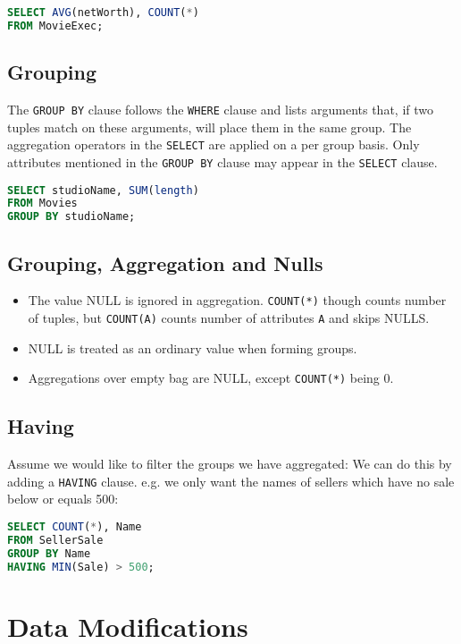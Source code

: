 \documentclass{article}
\renewcommand{\t}[1]{\texttt{#1}}
\begin{document}
\begin{lstlisting}[language=SQL]
SELECT AVG(netWorth), COUNT(*) 
FROM MovieExec;
\end{lstlisting}


\subsection*{Grouping}
The \t{GROUP BY} clause follows the \t{WHERE} clause and lists arguments that, if two tuples match on these arguments, will place them in the same group. The aggregation operators in the \t{SELECT} are applied on a per group basis. Only attributes mentioned in the \t{GROUP BY} clause may appear in the \t{SELECT} clause.

\begin{lstlisting}[language=SQL]
SELECT studioName, SUM(length)
FROM Movies
GROUP BY studioName;
\end{lstlisting}

\subsection*{Grouping, Aggregation and Nulls}
\begin{itemize}
	\item The value NULL is ignored in aggregation. \t{COUNT(*)} though counts number of tuples, but \t{COUNT(A)} counts number of attributes \t{A} and skips NULLS.
	\item NULL is treated as an ordinary value when forming groups.
	\item Aggregations over empty bag are NULL, except \t{COUNT(*)} being 0.
\end{itemize}


\subsection*{Having}

Assume we would like to filter the groups we have aggregated: We can do this by adding a \t{HAVING} clause. e.g. we only want the names of sellers which have no sale below or equals 500:

\begin{lstlisting}[language=SQL]
SELECT COUNT(*), Name
FROM SellerSale
GROUP BY Name
HAVING MIN(Sale) > 500;
\end{lstlisting}


\section*{Data Modifications}
\end{document}
